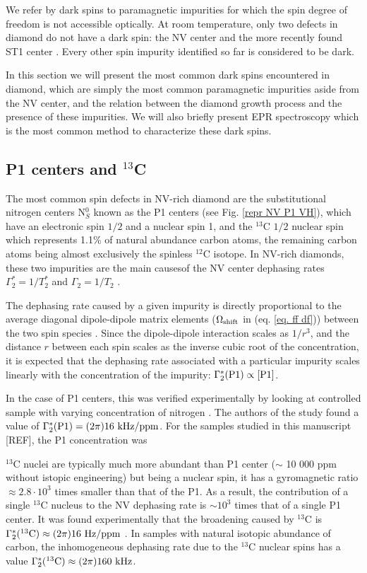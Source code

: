 \documentclass[a4paper, 11pt]{book}
\begin{document}
We refer by dark spins to paramagnetic impurities for which the spin degree of freedom is not accessible optically. At room temperature, only two defects in diamond do not have a dark spin: the NV center and the more recently found ST1 center \citep{lee2013readout, john2017bright}. Every other spin impurity identified so far is considered to be dark.

In this section we will present the most common dark spins encountered in diamond, which are simply the most common paramagnetic impurities aside from the NV center, and the relation between the diamond growth process and the presence of these impurities. We will also briefly present EPR spectroscopy which is the most common method to characterize these dark spins.

\subsection{P1 centers and $^{13}$C}
The most common spin defects in NV-rich diamond are the substitutional nitrogen centers N$^0_S$ known as the P1 centers (see Fig. \ref{repr NV P1 VH}), which have an electronic spin $1/2$ and a nuclear spin 1, and the $^{13}$C $1/2$ nuclear spin which represents 1.1\% of natural abundance carbon atoms, the remaining carbon atoms being almost exclusively the spinless $^{12}$C isotope. In NV-rich diamonds, these two impurities are the main causesof the NV center dephasing rates $\Gamma_2^*=1/T_2^*$ and $\Gamma_2=1/T_2$  \citep{barry2020sensitivity}. 

The dephasing rate caused by a given impurity is directly proportional to the average diagonal dipole-dipole matrix elements ($\Omega_{\rm shift}$ in (eq. \ref{eq. ff df})) between the two spin species \citep{taylor2008high, bauch2020decoherence}. Since the dipole-dipole interaction scales as $1/r^3$, and the distance $r$ between each spin scales as the inverse cubic root of the concentration,  it is expected that the dephasing rate associated with a particular impurity scales linearly with the concentration of the impurity: $\Gamma_2^*(\rm P1) \propto [P1]$. 

In the case of P1 centers, this was verified experimentally by looking at controlled sample with varying concentration of nitrogen \citep{bauch2020decoherence}. The authors of the study found a value of $\Gamma_2^*(\rm P1)= (2 \pi) 16\ \rm kHz/ppm$. For the samples studied in this manuscript [REF], the P1 concentration was 

$^{13}$C nuclei are typically much more abundant than P1 center ($\sim$ 10 000 ppm without istopic engineering) but being a nuclear spin, it has a gyromagnetic ratio $\approx 2.8\cdot 10^3$ times smaller than that of the P1. As a result, the contribution of a single $^{13}$C nucleus to the NV dephasing rate is $\sim 10^3$ times that of a single P1 center. It was found experimentally that the broadening caused by $^{13}$C is $\Gamma_2^*(^{13}\rm C ) \approx (2 \pi) 16\ \rm Hz/ppm$ \citep{van1997dependences, barry2020sensitivity}. In samples with natural isotopic abundance of carbon, the inhomogeneous dephasing rate due to the $^{13}$C nuclear spins has a value $\Gamma_2^*(^{13}\rm C ) \approx (2 \pi) 160\ \rm kHz$.
\end{document}
